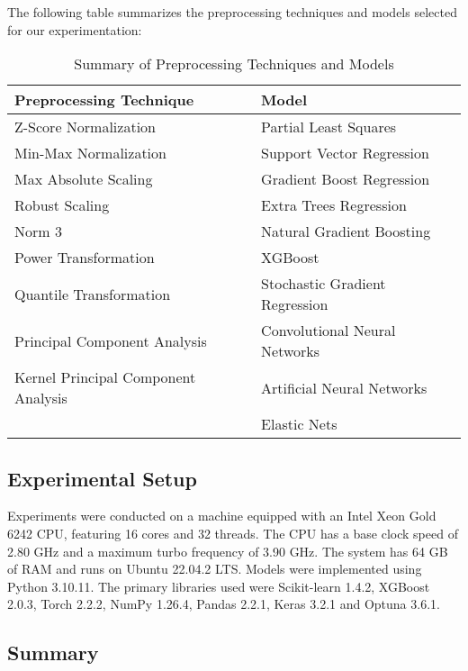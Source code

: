 The following table summarizes the preprocessing techniques and models selected for our experimentation:

\begin{table}[ht]
\centering
\begin{tabular}{@{}ll@{}}
\toprule
\textbf{Preprocessing Technique}    & \textbf{Model} \\ \midrule
Z-Score Normalization               & Partial Least Squares \\
Min-Max Normalization               & Support Vector Regression \\
Max Absolute Scaling                & Gradient Boost Regression \\
Robust Scaling                      & Extra Trees Regression \\
Norm 3                              & Natural Gradient Boosting \\ \bottomrule
Power Transformation                & XGBoost \\ \bottomrule
Quantile Transformation             & Stochastic Gradient Regression \\ \bottomrule
Principal Component Analysis        & Convolutional Neural Networks \\ \bottomrule
Kernel Principal Component Analysis & Artificial Neural Networks \\ \bottomrule
                                    & Elastic Nets \\ \bottomrule
\end{tabular}
\caption{Summary of Preprocessing Techniques and Models}
\label{tab:preprocessing-models}
\end{table}




\subsection{Experimental Setup}
Experiments were conducted on a machine equipped with an Intel Xeon Gold 6242 CPU, featuring 16 cores and 32 threads.
The CPU has a base clock speed of 2.80 GHz and a maximum turbo frequency of 3.90 GHz.
The system has 64 GB of RAM and runs on Ubuntu 22.04.2 LTS.
Models were implemented using Python 3.10.11.
The primary libraries used were Scikit-learn 1.4.2, XGBoost 2.0.3, Torch 2.2.2, NumPy 1.26.4, Pandas 2.2.1, Keras 3.2.1 and Optuna 3.6.1.




\subsection{Summary}
